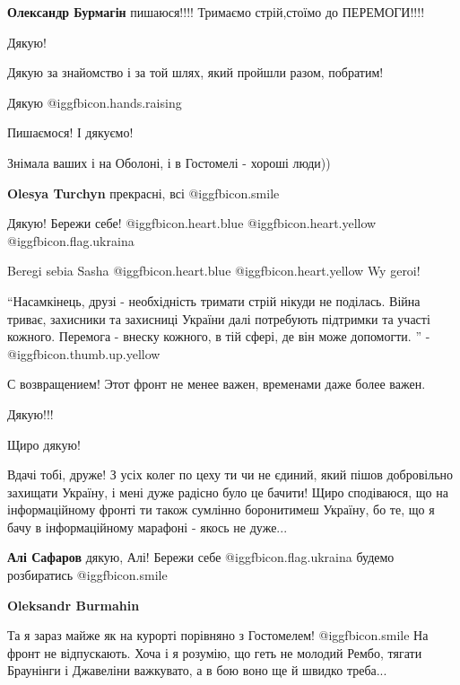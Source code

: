 \begin{itemize}
\textbf{Олександр Бурмагін} пишаюся!!!! Тримаємо стрій,стоїмо до ПЕРЕМОГИ!!!!

Дякую!

Дякую за знайомство і за той шлях, який пройшли разом, побратим!

Дякую @igg{fbicon.hands.raising} 

Пишаємося! І дякуємо!

Знімала ваших і на Оболоні, і в Гостомелі - хороші люди))

\textbf{Olesya Turchyn} прекрасні, всі @igg{fbicon.smile} 

Дякую! Бережи себе!  @igg{fbicon.heart.blue}  @igg{fbicon.heart.yellow} @igg{fbicon.flag.ukraina}

Beregi sebia Sasha  @igg{fbicon.heart.blue}  @igg{fbicon.heart.yellow}  Wy geroi!


\enquote{Насамкінець, друзі - необхідність тримати стрій нікуди не поділась. Війна
триває, захисники та захисниці України далі потребують підтримки та участі
кожного. Перемога - внеску кожного, в тій сфері, де він може допомогти. } -  @igg{fbicon.thumb.up.yellow} 

С возвращением! Этот фронт не менее важен, временами даже более важен.

Дякую!!!

Щиро дякую!


Вдачі тобі, друже! З усіх колег по цеху ти чи не єдиний, який пішов добровільно
захищати Україну, і мені дуже радісно було це бачити! Щиро сподіваюся, що на
інформаційному фронті ти також сумлінно боронитимеш Україну, бо те, що я бачу в
інформаційному марафоні - якось не дуже...

\begin{itemize} %
\textbf{Алі Сафаров} дякую, Алі! Бережи себе @igg{fbicon.flag.ukraina} будемо розбиратись @igg{fbicon.smile} 

\textbf{Oleksandr Burmahin} 

Та я зараз майже як на курорті порівняно з Гостомелем!  @igg{fbicon.smile}  На фронт не
відпускають. Хоча і я розумію, що геть не молодий Рембо, тягати Браунінги і
Джавеліни важкувато, а в бою воно ще й швидко треба...


\end{itemize}
\end{itemize}
